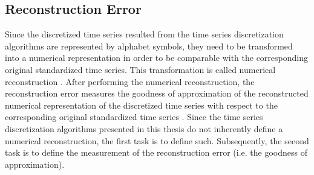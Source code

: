 \subsection{Reconstruction Error}
Since the discretized time series resulted from the time series discretization algorithms are represented by alphabet symbols, they need to be transformed into a numerical representation in order to be comparable with the corresponding original standardized time series. This transformation is called numerical reconstruction \cite{APCA}. After performing the numerical reconstruction, the reconstruction error measures the goodness of approximation of the reconstructed numerical representation of the discretized time series with respect to the corresponding original standardized time series \cite{APCA}. Since the time series discretization algorithms presented in this thesis do not inherently define a numerical reconstruction, the first task is to define such. Subsequently, the second task is to define the measurement of the reconstruction error (i.e. the goodness of approximation).
